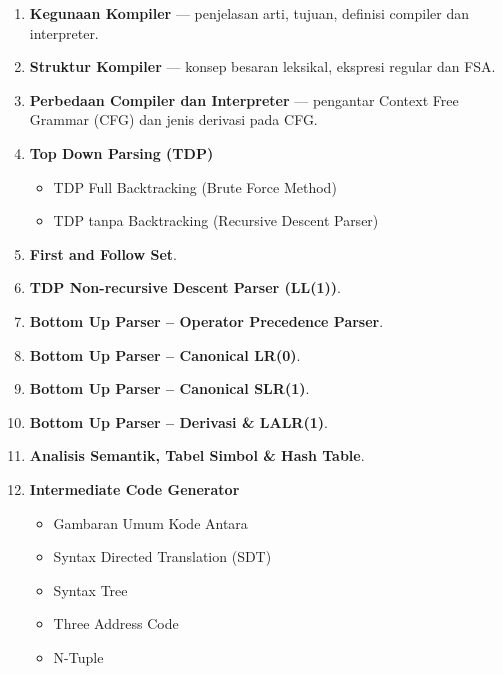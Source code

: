 \begin{enumerate}
  \item \textbf{Kegunaan Kompiler} --- penjelasan arti, tujuan, definisi compiler dan interpreter.
  \item \textbf{Struktur Kompiler} --- konsep besaran leksikal, ekspresi regular dan FSA.
  \item \textbf{Perbedaan Compiler dan Interpreter} --- pengantar Context Free Grammar (CFG) dan jenis derivasi pada CFG.
  \item \textbf{Top Down Parsing (TDP)}
    \begin{itemize}
      \item TDP Full Backtracking (Brute Force Method)
      \item TDP tanpa Backtracking (Recursive Descent Parser)
    \end{itemize}
  \item \textbf{First and Follow Set}.
  \item \textbf{TDP Non-recursive Descent Parser (LL(1))}.
  \item \textbf{Bottom Up Parser – Operator Precedence Parser}.
  \item \textbf{Bottom Up Parser – Canonical LR(0)}.
  \item \textbf{Bottom Up Parser – Canonical SLR(1)}.
  \item \textbf{Bottom Up Parser – Derivasi \& LALR(1)}.
  \item \textbf{Analisis Semantik, Tabel Simbol \& Hash Table}.
  \item \textbf{Intermediate Code Generator}
    \begin{itemize}
      \item Gambaran Umum Kode Antara
      \item Syntax Directed Translation (SDT)
      \item Syntax Tree
      \item Three Address Code
      \item N-Tuple
    \end{itemize}
\end{enumerate}
